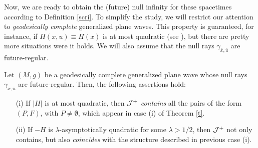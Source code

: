 Now, we are ready to obtain the (future) null infinity for these spacetimes according to Definition \ref{scri}. To simplify the study, we will restrict our attention to {\em geodesically complete} generalized plane waves. This property is guaranteed, for instance, if $H(x,u)\equiv H(x)$ is at most quadratic (see \cite[Corollary 3.4]{CandelaGeneralPlaneFronted2003}), but there are pretty more situations were it holds. We will also assume that the null rays $\gamma_{\overline{x},\overline{u}}$ are future-regular.
\begin{corollary} Let $(M,g)$ be a geodesically complete generalized plane wave whose null rays $\gamma_{\overline{x},\overline{u}}$ are future-regular. Then, the following assertions hold:
\begin{itemize}
\item[(i)] If $|H|$ is at most quadratic, then ${\cal J}^+$ {\em contains} all the pairs of the form $(P,F)$, with $P\neq\emptyset$, which appear in case (i) of Theorem \ref{t}.
\item[(ii)] If $-H$ is $\lambda$-asymptotically quadratic for some
$\lambda>1/2$, then ${\cal J}^+$ not only contains, but also {\em coincides} with the structure described in previous case (i).
\end{itemize}
\end{corollary}

